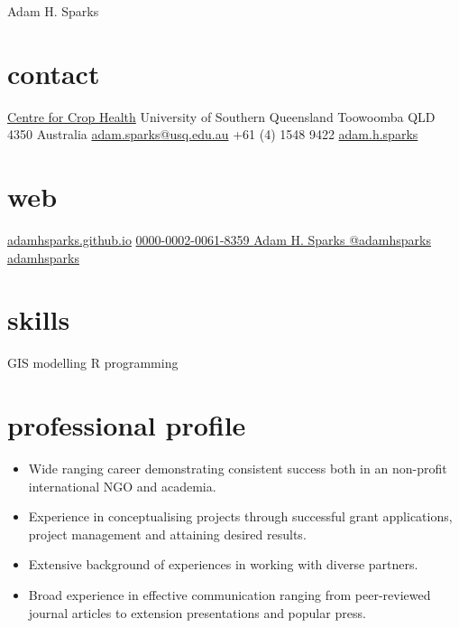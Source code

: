
\hfill {\Huge Adam H. Sparks}
\begin{aside}
\small{\section{contact}}
\small{\href{http://www.usq.edu.au/research/research-at-usq/institutes-centres/cch}{Centre for Crop Health}}
\small{University of Southern Queensland}
\small{Toowoomba QLD 4350}
\small{Australia}
\small{\href{mailto:adam.sparks@usq.edu.au}{adam.sparks@usq.edu.au}}
\small{+61 (4) 1548 9422 \faMobilePhone{}}
\small{\href{skype:adam.h.sparks?call}{adam.h.sparks }}
\section{web}
\footnotesize{\href{https://adamhsparks.github.io}{adamhsparks.github.io} \FA {}}
\footnotesize{\href{http://orcid.org/0000-0002-0061-8359}{0000-0002-0061-8359 {\color{orcid.green}}}}
\footnotesize{\href{https://www.linkedin.com/in/adam-h-sparks-507b968}{Adam H. Sparks {\color{linkedin}\FA {}}}}
\footnotesize{\href{https://www.twitter.com/adamhsparks/}{@adamhsparks {\color{twitter.blue}\FA {}}}}
\footnotesize{\href{https://github.com/adamhsparks/}{adamhsparks \FA {}}}
\footnotesize{\section{skills}}
\small{GIS}
\small{modelling}
\small{R programming}
\end{aside}

\section*{professional profile}

\begin{itemize}
\setlength{\leftmargin}{0pt}
\item Wide ranging career demonstrating consistent success both in an non-profit international NGO and academia.
\item Experience in conceptualising projects through successful grant applications, project management and attaining desired results.
\item Extensive background of experiences in working with diverse partners.
\item Broad experience in effective communication ranging from peer-reviewed journal articles to extension presentations and popular press.
\end{itemize}


